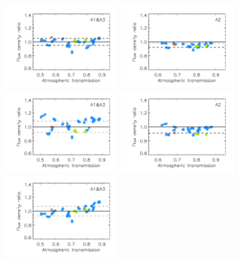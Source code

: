 \begin{figure}[ht!]
  \begin{center}
    \includegraphics[clip=true, trim={0.9cm, 0.2cm, 0, 0.6cm},width=0.38\textwidth]{Figures/Calibration/plot_flux_density_ratio_MWC349_obstau_corrected_skydip_narrow_1mm.pdf}
    \includegraphics[clip=true, trim={0.9cm, 0.2cm, 0, 0.6cm},width=0.38\textwidth]{Figures/Calibration/plot_flux_density_ratio_MWC349_obstau_corrected_skydip_narrow_a2.pdf}
    \includegraphics[clip=true, trim={0.9cm, 0.2cm, 0, 0.6cm},width=0.38\textwidth]{Figures/Calibration/plot_flux_density_ratio_MWC349_obstau_tau225_narrow_1mm.pdf}
    \includegraphics[clip=true, trim={0.9cm, 0.2cm, 0, 0.6cm},width=0.38\textwidth]{Figures/Calibration/plot_flux_density_ratio_MWC349_obstau_tau225_narrow_a2.pdf}
    \includegraphics[clip=true, trim={0.9cm, 0.2cm, 0, 0.6cm},width=0.38\textwidth]{Figures/Calibration/plot_flux_density_ratio_MWC349_obstau_skydip_narrow_1mm.pdf}

\end{center}
\end{figure}
